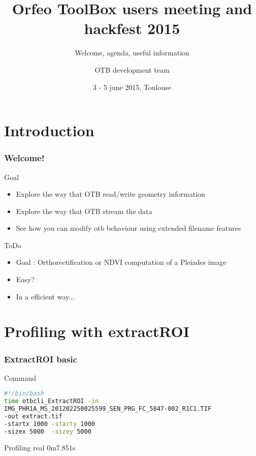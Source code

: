 \documentclass[8pt]{beamer}
\title{Orfeo ToolBox users meeting and hackfest 2015}
\subtitle{Welcome, agenda, useful information}
\author{OTB development team}%
\date{3 - 5 june 2015, Toulouse}
\begin{document}
\begin{frame}
\titlepage
\end{frame}

\section{Introduction}
\begin{frame}
\frametitle{Welcome!}
\begin{block}{Goal}
\begin{itemize}
\item Explore the way that OTB read/write geometry information
\item Explore the way that OTB stream the data
\item See how you can modify otb behaviour using extended filename features
\end{itemize}
\end{block}

\begin{block}{ToDo}
\begin{itemize}
\item Goal : Orthorectification or NDVI computation  of a Pleiades image
\item Easy?
\item In a efficient way...
\end{itemize}
\end{block}

\end{frame}

\section{Profiling with extractROI}

\begin{frame}[fragile]
\frametitle{ExtractROI basic}

\begin{block}{Command}
\begin{lstlisting}[language=bash]
#!/bin/bash
time otbcli_ExtractROI -in
IMG_PHR1A_MS_201202250025599_SEN_PRG_FC_5847-002_R1C1.TIF 
-out extract.tif 
-startx 1000 -starty 1000 
-sizex 5000  -sizey 5000 
\end{lstlisting}
\end{block}

\begin{block}{Profiling}
real	0m7.851s
\end{block}

\end{frame}
\end{document}
